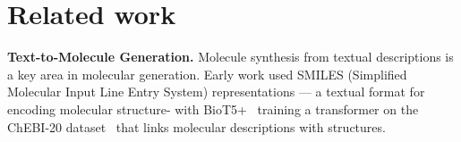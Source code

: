 \documentclass[10pt]{article} %
\begin{document}



\section{Related work}

\textbf{Text-to-Molecule Generation.}  
Molecule synthesis from textual descriptions is a key area in molecular generation. Early work used SMILES (Simplified Molecular Input Line Entry System) representations — a textual format for encoding molecular structure- with BioT5+~\cite{pei-etal-2024-biot5} training a transformer on the ChEBI-20 dataset~\cite{edwards2021text2mol} that links molecular descriptions with structures.
\end{document}
